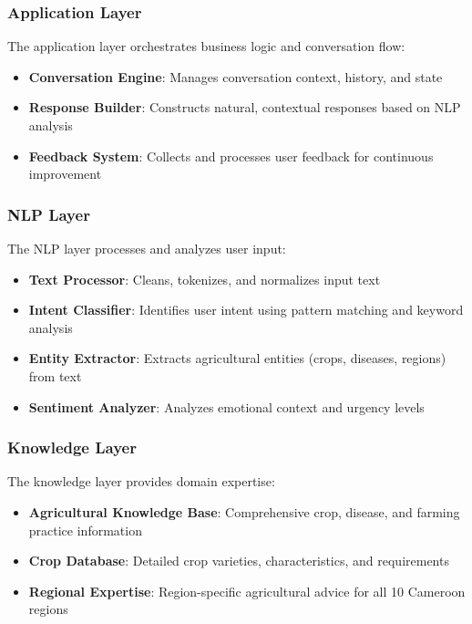\documentclass[12pt,a4paper]{article}
\begin{document}
\subsubsection{Application Layer}

The application layer orchestrates business logic and conversation flow:

\begin{itemize}[leftmargin=*]
    \item \textbf{Conversation Engine}: Manages conversation context, history, and state
    \item \textbf{Response Builder}: Constructs natural, contextual responses based on NLP analysis
    \item \textbf{Feedback System}: Collects and processes user feedback for continuous improvement
\end{itemize}

\subsubsection{NLP Layer}

The NLP layer processes and analyzes user input:

\begin{itemize}[leftmargin=*]
    \item \textbf{Text Processor}: Cleans, tokenizes, and normalizes input text
    \item \textbf{Intent Classifier}: Identifies user intent using pattern matching and keyword analysis
    \item \textbf{Entity Extractor}: Extracts agricultural entities (crops, diseases, regions) from text
    \item \textbf{Sentiment Analyzer}: Analyzes emotional context and urgency levels
\end{itemize}

\subsubsection{Knowledge Layer}

The knowledge layer provides domain expertise:

\begin{itemize}[leftmargin=*]
    \item \textbf{Agricultural Knowledge Base}: Comprehensive crop, disease, and farming practice information
    \item \textbf{Crop Database}: Detailed crop varieties, characteristics, and requirements
    \item \textbf{Regional Expertise}: Region-specific agricultural advice for all 10 Cameroon regions
\end{itemize}
\end{document}
